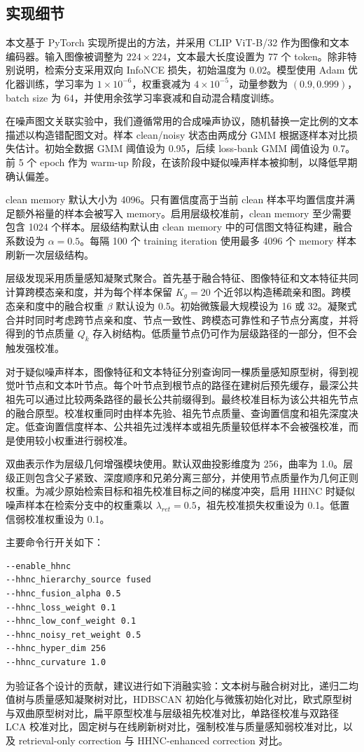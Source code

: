 \subsection{实现细节}
\label{sec:implementation}

本文基于 PyTorch 实现所提出的方法，并采用 CLIP ViT-B/32 作为图像和文本编码器。输入图像被调整为 $224\times224$，文本最大长度设置为 77 个 token。除非特别说明，检索分支采用双向 InfoNCE 损失，初始温度为 0.02。模型使用 Adam 优化器训练，学习率为 $1\times10^{-6}$，权重衰减为 $4\times10^{-5}$，动量参数为 $(0.9,0.999)$，batch size 为 64，并使用余弦学习率衰减和自动混合精度训练。

在噪声图文关联实验中，我们遵循常用的合成噪声协议，随机替换一定比例的文本描述以构造错配图文对。样本 clean/noisy 状态由两成分 GMM 根据逐样本对比损失估计。初始全数据 GMM 阈值设为 0.95，后续 loss-bank GMM 阈值设为 0.7。前 5 个 epoch 作为 warm-up 阶段，在该阶段中疑似噪声样本被抑制，以降低早期确认偏差。

clean memory 默认大小为 4096。只有置信度高于当前 clean 样本平均置信度并满足额外裕量的样本会被写入 memory。启用层级校准前，clean memory 至少需要包含 1024 个样本。层级结构默认由 clean memory 中的可信图文特征构建，融合系数设为 $\alpha=0.5$。每隔 100 个 training iteration 使用最多 4096 个 memory 样本刷新一次层级结构。

层级发现采用质量感知凝聚式聚合。首先基于融合特征、图像特征和文本特征共同计算跨模态亲和度，并为每个样本保留 $K_g=20$ 个近邻以构造稀疏亲和图。跨模态亲和度中的融合权重 $\beta$ 默认设为 0.5。初始微簇最大规模设为 16 或 32。凝聚式合并时同时考虑跨节点亲和度、节点一致性、跨模态可靠性和子节点分离度，并将得到的节点质量 $Q_k$ 存入树结构。低质量节点仍可作为层级路径的一部分，但不会触发强校准。

对于疑似噪声样本，图像特征和文本特征分别查询同一棵质量感知原型树，得到视觉叶节点和文本叶节点。每个叶节点到根节点的路径在建树后预先缓存，最深公共祖先可以通过比较两条路径的最长公共前缀得到。最终校准目标为该公共祖先节点的融合原型。校准权重同时由样本先验、祖先节点质量、查询置信度和祖先深度决定。低查询置信度样本、公共祖先过浅样本或祖先质量较低样本不会被强校准，而是使用较小权重进行弱校准。

双曲表示作为层级几何增强模块使用。默认双曲投影维度为 256，曲率为 1.0。层级正则包含父子紧致、深度顺序和兄弟分离三部分，并使用节点质量作为几何正则权重。为减少原始检索目标和祖先校准目标之间的梯度冲突，启用 HHNC 时疑似噪声样本在检索分支中的权重乘以 $\lambda_{ret}=0.5$，祖先校准损失权重设为 0.1。低置信弱校准权重设为 0.1。

主要命令行开关如下：
\begin{verbatim}
--enable_hhnc
--hhnc_hierarchy_source fused
--hhnc_fusion_alpha 0.5
--hhnc_loss_weight 0.1
--hhnc_low_conf_weight 0.1
--hhnc_noisy_ret_weight 0.5
--hhnc_hyper_dim 256
--hhnc_curvature 1.0
\end{verbatim}

为验证各个设计的贡献，建议进行如下消融实验：文本树与融合树对比，递归二均值树与质量感知凝聚树对比，HDBSCAN 初始化与微簇初始化对比，欧式原型树与双曲原型树对比，扁平原型校准与层级祖先校准对比，单路径校准与双路径 LCA 校准对比，固定树与在线刷新树对比，强制校准与质量感知弱校准对比，以及 retrieval-only correction 与 HHNC-enhanced correction 对比。

